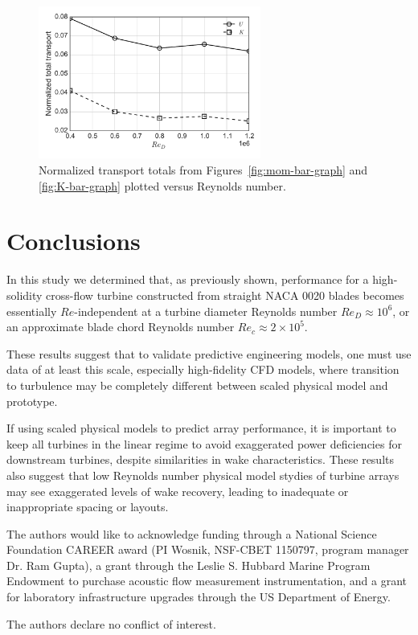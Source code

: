 \documentclass[energies,article,accept,moreauthors,pdftex,12pt,a4paper]{mdpi}
\begin{document}
\begin{figure}[ht!]
\centering
\includegraphics[width=0.65\textwidth]{figures/wake_trans_totals}
\caption{Normalized transport totals from Figures~\ref{fig:mom-bar-graph} and 
\ref{fig:K-bar-graph} plotted versus Reynolds number.}
\label{fig:wake-trans-totals}
\end{figure}


\section{Conclusions}

In this study we determined that, as previously shown, performance for a
high-solidity cross-flow turbine constructed from straight NACA 0020 blades
becomes essentially $Re$-independent at a turbine diameter Reynolds number $Re_D
\approx 10^6$, or an approximate blade chord Reynolds number $Re_c \approx 2
\times 10^5$.

These results suggest that to validate predictive engineering models, one must
use data of at least this scale, especially high-fidelity CFD models, where
transition to turbulence may be completely different between scaled physical
model and prototype.

If using scaled physical models to predict array performance, it is important to
keep all turbines in the linear regime to avoid exaggerated power deficiencies
for downstream turbines, despite similarities in wake characteristics. These
results also suggest that low Reynolds number physical model stydies of turbine
arrays may see exaggerated levels of wake recovery, leading to inadequate or
inappropriate spacing or layouts.


The authors would like to acknowledge funding through a National Science
Foundation CAREER award (PI Wosnik, NSF-CBET 1150797, program manager Dr. Ram
Gupta), a grant through the Leslie S. Hubbard Marine Program Endowment to
purchase acoustic flow measurement instrumentation, and a grant for laboratory
infrastructure upgrades through the US Department of Energy.


The authors declare no conflict of interest.




\end{document}
